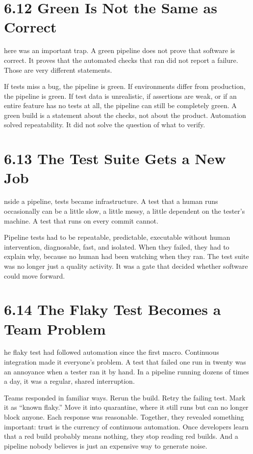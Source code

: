 \documentclass[11pt, a4paper, openany]{book}
\newcommand{\initialcap}[1]{{\fontfamily{lmss}\selectfont\huge\textbf{#1}}}
\begin{document}
\section{6.12 Green Is Not the Same as Correct}
\noindent \initialcap{T}here was an important trap. A green pipeline does not prove that software is correct. It proves that the automated checks that ran did not report a failure. Those are very different statements.

\noindent If tests miss a bug, the pipeline is green. If environments differ from production, the pipeline is green. If test data is unrealistic, if assertions are weak, or if an entire feature has no tests at all, the pipeline can still be completely green. A green build is a statement about the checks, not about the product. Automation solved repeatability. It did not solve the question of what to verify.

\section{6.13 The Test Suite Gets a New Job}
\noindent \initialcap{I}nside a pipeline, tests became infrastructure. A test that a human runs occasionally can be a little slow, a little messy, a little dependent on the tester's machine. A test that runs on every commit cannot.

\noindent Pipeline tests had to be repeatable, predictable, executable without human intervention, diagnosable, fast, and isolated. When they failed, they had to explain why, because no human had been watching when they ran. The test suite was no longer just a quality activity. It was a gate that decided whether software could move forward.

\section{6.14 The Flaky Test Becomes a Team Problem}
\noindent \initialcap{T}he flaky test had followed automation since the first macro. Continuous integration made it everyone's problem. A test that failed one run in twenty was an annoyance when a tester ran it by hand. In a pipeline running dozens of times a day, it was a regular, shared interruption.

\noindent Teams responded in familiar ways. Rerun the build. Retry the failing test. Mark it as ``known flaky.'' Move it into quarantine, where it still runs but can no longer block anyone. Each response was reasonable. Together, they revealed something important: trust is the currency of continuous automation. Once developers learn that a red build probably means nothing, they stop reading red builds. And a pipeline nobody believes is just an expensive way to generate noise.
\end{document}
